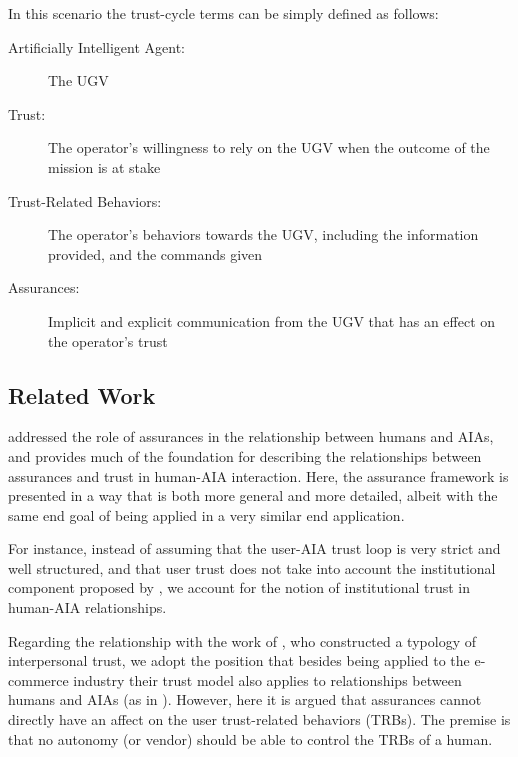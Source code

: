     In this scenario the trust-cycle terms can be simply defined as follows:

    \begin{description}
        \item [Artificially Intelligent Agent:] The UGV
        \item [Trust:] The operator's willingness to rely on the UGV when the outcome of the mission is at stake
        \item [Trust-Related Behaviors:] The operator's behaviors towards the UGV, including the information provided, and the commands given
        \item [Assurances:] Implicit and explicit communication from the UGV that has an effect on the operator's trust
    \end{description}

\subsection{Related Work}\label{sec:rel_work}
    \citet{Lillard2016-yg} addressed the role of assurances in the relationship between humans and AIAs, and provides much of the foundation for describing the relationships between assurances and trust in human-AIA interaction. Here, the assurance framework is presented in a way that is both more general and more detailed, albeit with the same end goal of being applied in a very similar end application. 
    
    For instance, instead of assuming that the user-AIA trust loop is very strict and well structured, and that user trust does not take into account the institutional component proposed by \citet{McKnight2001-fa}, we account for the notion of institutional trust in  human-AIA relationships.

    Regarding the relationship with the work of \citet{McKnight2001-fa}, who constructed a typology of interpersonal trust,  we adopt the position that besides being applied to the e-commerce industry their trust model also applies to relationships between humans and AIAs (as in \citet{Lillard2016-yg}). However, here it is argued that assurances cannot directly have an affect on the user trust-related behaviors (TRBs). The premise is that no autonomy (or vendor) should be able to control the TRBs of a human.





